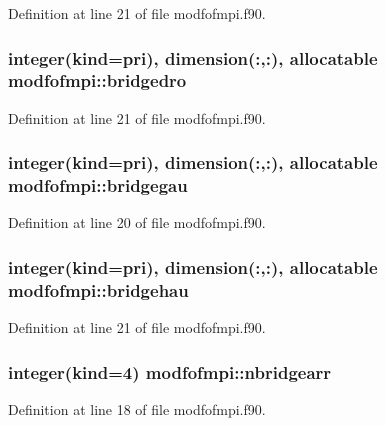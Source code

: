 Definition at line 21 of file modfofmpi.\-f90.

\hypertarget{classmodfofmpi_a400402d1fc58970ecda00536a07c021c}{
\subsubsection[{bridgedro}]{\setlength{\rightskip}{0pt plus 5cm}integer(kind=pri), dimension(\-:,\-:), allocatable modfofmpi\-::bridgedro}}\label{classmodfofmpi_a400402d1fc58970ecda00536a07c021c}


Definition at line 21 of file modfofmpi.\-f90.

\hypertarget{classmodfofmpi_a157af8da53311980e23d05748e181a7f}{
\subsubsection[{bridgegau}]{\setlength{\rightskip}{0pt plus 5cm}integer(kind=pri), dimension(\-:,\-:), allocatable modfofmpi\-::bridgegau}}\label{classmodfofmpi_a157af8da53311980e23d05748e181a7f}


Definition at line 20 of file modfofmpi.\-f90.

\hypertarget{classmodfofmpi_a5a9577c42a1c3c53db8eb603945b530b}{
\subsubsection[{bridgehau}]{\setlength{\rightskip}{0pt plus 5cm}integer(kind=pri), dimension(\-:,\-:), allocatable modfofmpi\-::bridgehau}}\label{classmodfofmpi_a5a9577c42a1c3c53db8eb603945b530b}


Definition at line 21 of file modfofmpi.\-f90.

\hypertarget{classmodfofmpi_a887d577430624ed6c6e8952b089e0576}{
\subsubsection[{nbridgearr}]{\setlength{\rightskip}{0pt plus 5cm}integer(kind=4) modfofmpi\-::nbridgearr}}\label{classmodfofmpi_a887d577430624ed6c6e8952b089e0576}


Definition at line 18 of file modfofmpi.\-f90.

